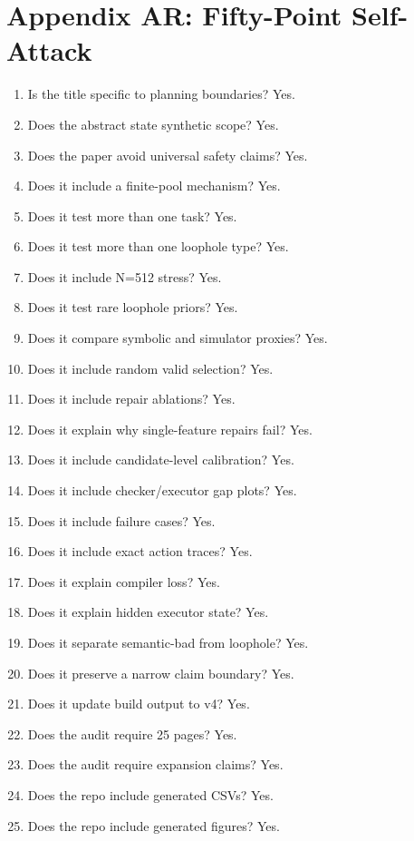 \documentclass{article}
\begin{document}
\section*{Appendix AR: Fifty-Point Self-Attack}

\begin{enumerate}
  \item Is the title specific to planning boundaries? Yes.
  \item Does the abstract state synthetic scope? Yes.
  \item Does the paper avoid universal safety claims? Yes.
  \item Does it include a finite-pool mechanism? Yes.
  \item Does it test more than one task? Yes.
  \item Does it test more than one loophole type? Yes.
  \item Does it include N=512 stress? Yes.
  \item Does it test rare loophole priors? Yes.
  \item Does it compare symbolic and simulator proxies? Yes.
  \item Does it include random valid selection? Yes.
  \item Does it include repair ablations? Yes.
  \item Does it explain why single-feature repairs fail? Yes.
  \item Does it include candidate-level calibration? Yes.
  \item Does it include checker/executor gap plots? Yes.
  \item Does it include failure cases? Yes.
  \item Does it include exact action traces? Yes.
  \item Does it explain compiler loss? Yes.
  \item Does it explain hidden executor state? Yes.
  \item Does it separate semantic-bad from loophole? Yes.
  \item Does it preserve a narrow claim boundary? Yes.
  \item Does it update build output to v4? Yes.
  \item Does the audit require 25 pages? Yes.
  \item Does the audit require expansion claims? Yes.
  \item Does the repo include generated CSVs? Yes.
  \item Does the repo include generated figures? Yes.

\end{enumerate}
\end{document}
